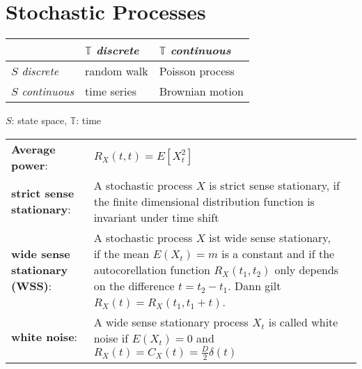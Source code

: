 
\section{Stochastic Processes }

\begin{tabular}{|l|l|l|}
	\hline
					&	$\mathbb{T}$ \textit{discrete}	& $\mathbb{T}$ \textit{continuous} \\
	\hline
	$S$ \textit{discrete} 	&	 random walk			& Poisson process \\
	\hline
	$S$ \textit{continuous}	&	time series				& Brownian motion \\	
	\hline
\end{tabular}
$S$: state space, $\mathbb{T}$: time \\

\begin{tabular}{ p{4.5cm} p{8cm} l}
	\textbf{Average power}: 			&	$R_X(t,t)=E\left[X_t^2\right]$	& \\
	\textbf{strict sense stationary}: 	&	A stochastic process $X$ is strict sense stationary, if the finite dimensional distribution function is invariant under time shift	 \\
	\textbf{wide sense stationary (WSS)}:& 	A stochastic process $X$ ist wide sense stationary, if the mean $E(X_t)=m$ is a constant and if the autocorellation function $R_X(t_1,t_2)$ only depends on the difference $t=t_2-t_1$. Dann gilt $R_X(t)=R_X(t_1,t_1+t)$. 	& \\
	\textbf{white noise}: 				&	A wide sense stationary process $X_t$ is called white noise if $E(X_t)=0$ and $R_X(t)=C_X(t)=\frac{D}{2}\delta(t)$	& \\
\end{tabular}

